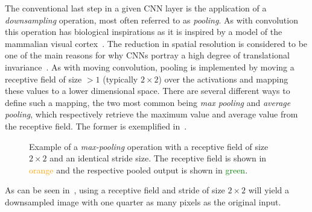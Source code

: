 The conventional last step in a given CNN layer is the application of a \textit{downsampling} operation, most often referred to as \textit{pooling}.
As with convolution this operation has biological inspirations as it is inspired by a model of the mammalian visual cortex~\cite[p.~966]{visint-cnn}.
The reduction in spatial resolution is considered to be one of the main reasons for why CNNs portray a high degree of translational invariance~\cite{cnn-translational-invariance}.
As with moving convolution, pooling is implemented by moving a receptive field of size $>1$ (typically $2 \times 2$) over the activations and mapping these values to a lower dimensional space.
There are several different ways to define such a mapping, the two most common being \textit{max pooling} and \textit{average pooling}, which respectively retrieve the maximum value and average value from the receptive field.
The former is exemplified in~.

\begin{figure}[htb]
  
  \caption{%
    Example of a \textit{max-pooling} operation with a receptive field of size $2 \times 2$ and an identical stride size.
    The receptive field is shown in \textcolor{orange}{orange} and the respective pooled output is shown in \textcolor{green}{green}.
  }%
  \label{fig:max-pooling}
\end{figure}

As can be seen in~, using a receptive field and stride of size $2 \times 2$ will yield a downsampled image with one quarter as many pixels as the original input.
